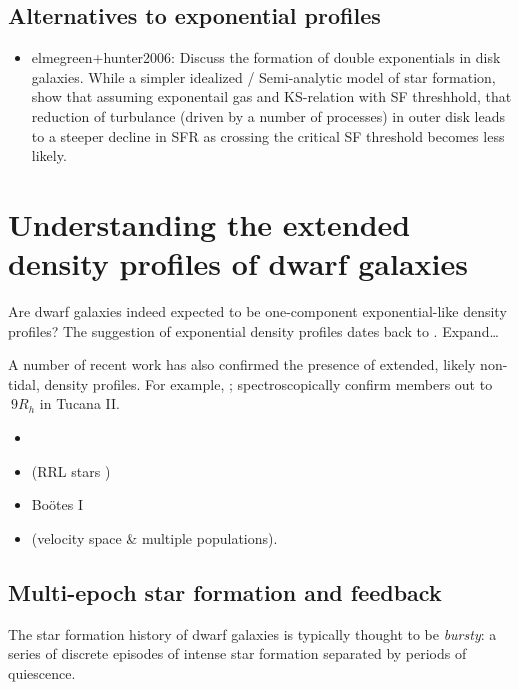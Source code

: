 \subsection{Alternatives to exponential
profiles}\label{alternatives-to-exponential-profiles}

\begin{itemize}
\tightlist
\item
  elmegreen+hunter2006: Discuss the formation of double exponentials in
  disk galaxies. While a simpler idealized / Semi-analytic model of star
  formation, show that assuming exponentail gas and KS-relation with SF
  threshhold, that reduction of turbulance (driven by a number of
  processes) in outer disk leads to a steeper decline in SFR as crossing
  the critical SF threshold becomes less likely.
\end{itemize}

\section{Understanding the extended density profiles of dwarf
galaxies}\label{understanding-the-extended-density-profiles-of-dwarf-galaxies}

Are dwarf galaxies indeed expected to be one-component exponential-like
density profiles? The suggestion of exponential density profiles dates
back to \citet{faber+lin1983}. Expand\ldots{}

A number of recent work has also confirmed the presence of extended,
likely non-tidal, density profiles. For example, \citet{chiti+2021};
\citet{chiti+2023} spectroscopically confirm members out to \(~9 R_h\)
in Tucana II.

\begin{itemize}
\tightlist
\item
  \citet{revaz+jablonka2018}
\item
  \citet{tau+vivas+martinez-vazquez2024} (RRL stars )
\item
  \citet{roderick+2016} Boötes I
\item
  \citet{mcconnachie+penarrubia+navarro2007} (velocity space \& multiple
  populations).
\end{itemize}

\subsection{Multi-epoch star formation and
feedback}\label{multi-epoch-star-formation-and-feedback}

The star formation history of dwarf galaxies is typically thought to be
\emph{bursty}: a series of discrete episodes of intense star formation
separated by periods of quiescence.

